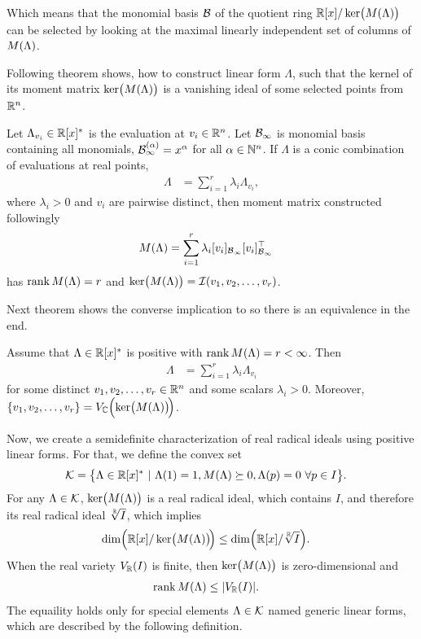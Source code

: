 Which means that the monomial basis $\mathcal{B}$ of the quotient ring $\mathbb{R}[x]/\operatorname{ker}\!\big(M(\Lambda)\big)$ can be selected by looking at the maximal linearly independent set of columns of $M(\Lambda)$.

Following theorem shows, how to construct linear form $\Lambda$, such that the kernel of its moment matrix $\operatorname{ker}\!\big(M(\Lambda)\big)$ is a vanishing ideal of some selected points from $\mathbb{R}^n$.

\begin{theorem}
  Let $\Lambda_{v_i}\in\mathbb{R}[x]^*$ is the evaluation at $v_i\in\mathbb{R}^n$.
  Let $\mathcal{B}_\infty$ is monomial basis containing all monomials, $\mathcal{B}_\infty^{(\alpha)} = x^\alpha$ for all $\alpha\in\mathbb{N}^n$.
  If $\Lambda$ is a conic combination of evaluations at real points,
  \begin{align}
    \Lambda &= \sum_{i=1}^r \lambda_i\Lambda_{v_i},
  \end{align}
  where $\lambda_i>0$ and $v_i$ are pairwise distinct, then moment matrix constructed followingly
  \begin{align}
    M(\Lambda) &=\sum_{i=1}^r \lambda_i[v_i]_{\mathcal{B}_\infty}[v_i]_{\mathcal{B}_\infty}^\top
  \end{align}
  has $\operatorname{rank}M(\Lambda) = r$ and $\operatorname{ker}\!\big(M(\Lambda)\big) = \mathcal{I}(v_1, v_2, \ldots, v_r)$.
\end{theorem}

Next theorem shows the converse implication to  so there is an equivalence in the end.

\begin{theorem}
  Assume that $\Lambda\in\mathbb{R}[x]^*$ is positive with $\operatorname{rank}M(\Lambda) = r < \infty$.
  Then
  \begin{align}
    \Lambda &= \sum_{i=1}^r\lambda_i\Lambda_{v_i}
  \end{align}
  for some distinct $v_1, v_2, \ldots, v_r\in\mathbb{R}^n$ and some scalars $\lambda_i > 0$.
  Moreover, $\{v_1, v_2, \ldots, v_r\}=V_{\mathbb{C}}\Big(\!\operatorname{ker}\!\big(M(\Lambda)\big)\!\Big)$.
\end{theorem}

Now, we create a semidefinite characterization of real radical ideals using positive linear forms.
For that, we define the convex set
\begin{align}
  \K &= \big\{\Lambda\in\R[x]^*\ |\ \Lambda(1) = 1, \ML \succeq 0, \Lambda(p) = 0\ \forall p\in I\big\}.\labeleq{POP:sol:K}
\end{align}
For any $\Lambda\in\mathcal{K}$, $\operatorname{ker}\!\big(M(\Lambda)\big)$ is a real radical ideal, which contains $I$, and therefore its real radical ideal $\sqrt[\mathbb{R}]{I}$, which implies
\begin{align}
  \dim\!\Big(\mathbb{R}[x]/\operatorname{ker}\!\big(M(\Lambda)\big)\!\Big) &\leq \dim\!\Big(\mathbb{R}[x]/\sqrt[\mathbb{R}]{I}\Big).
\end{align}
When the real variety $V_{\mathbb{R}}(I)$ is finite, then $\operatorname{ker}\!\big(M(\Lambda)\big)$ is zero-dimensional and
\begin{align}
  \operatorname{rank}M(\Lambda) &\leq |V_{\mathbb{R}}(I)|.
\end{align}
The equaility holds only for special elements $\Lambda\in\mathcal{K}$ named generic linear forms, which are described by the following definition.

